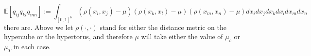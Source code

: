 \documentclass{article}
\begin{document}
\begin{equation}
    \label{eq:big_integral}
    \mathbb{E}[q_{ij}q_{kl}q_{mn}] := \int_{[0,1]^6} (\rho(x_i,x_j)-\mu)(\rho(x_k,x_l)-\mu)(\rho(x_m,x_n)-\mu)dx_idx_jdx_kdx_ldx_mdx_n
\end{equation}
there are. Above we let $\rho(\cdot, \cdot)$ stand for either the distance metric on the hypercube or the hypertorus, and therefore $\mu$ will take either the value of $\mu_c$ or $\mu_T$ in each case. 


    
    
    

    
    

    
\end{document}
